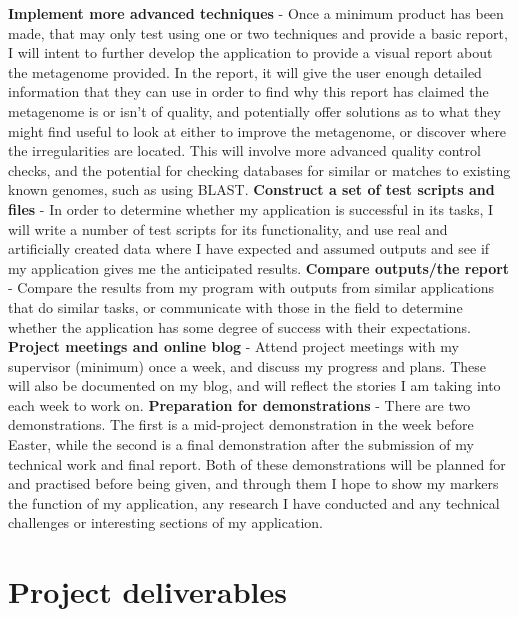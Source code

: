 \documentclass[11pt,fleqn,twoside]{article}
\begin{document}
\newline
\noindent
\textbf{Implement more advanced techniques} - Once a minimum product has been made, that may only test using one or two techniques and provide a basic report, I will intent to further develop the application to provide a visual report about the metagenome provided. In the report, it will give the user enough detailed information that they can use in order to find why this report has claimed the metagenome is or isn't of quality, and potentially offer solutions as to what they might find useful to look at either to improve the metagenome, or discover where the irregularities are located. This will involve more advanced quality control checks, and the potential for checking databases for similar or matches to existing known genomes, such as using BLAST\cite{blast}.
\newline
\noindent
\textbf{Construct a set of test scripts and files} - In order to determine whether my application is successful in its tasks, I will write a number of test scripts for its functionality, and use real and artificially created data where I have expected and assumed outputs and see if my application gives me the anticipated results.
\newline
\noindent
\textbf{Compare outputs/the report} - Compare the results from my program with outputs from similar applications that do similar tasks, or communicate with those in the field to determine whether the application has some degree of success with their expectations.
\newline
\noindent
\textbf{Project meetings and online blog} - Attend project meetings with my supervisor (minimum) once a week, and discuss my progress and plans. These will also be documented on my blog, and will reflect the stories I am taking into each week to work on.
\newline
\noindent
\textbf{Preparation for demonstrations} - There are two demonstrations. The first is a mid-project demonstration in the week before Easter, while the second is a final demonstration after the submission of my technical work and final report. Both of these demonstrations will be planned for and practised before being given, and through them I hope to show my markers the function of my application, any research I have conducted and any technical challenges or interesting sections of my application. 

\section{Project deliverables}
\end{document}
